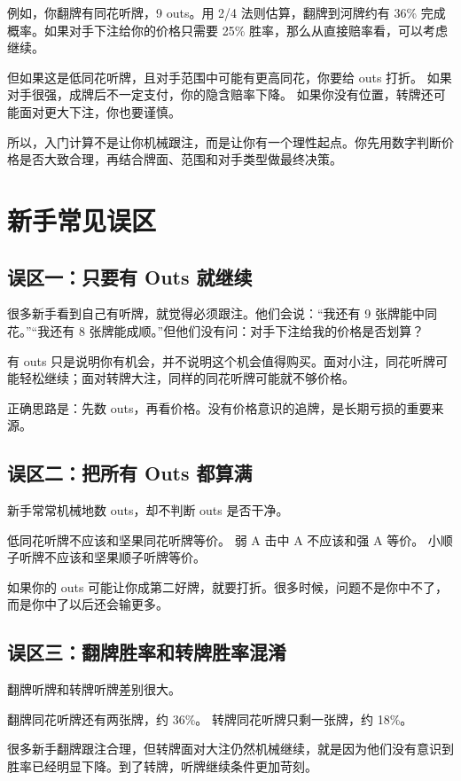 例如，你翻牌有同花听牌，9 outs。用 2/4 法则估算，翻牌到河牌约有 36\% 完成概率。如果对手下注给你的价格只需要 25\% 胜率，那么从直接赔率看，可以考虑继续。

但如果这是低同花听牌，且对手范围中可能有更高同花，你要给 outs 打折。
如果对手很强，成牌后不一定支付，你的隐含赔率下降。
如果你没有位置，转牌还可能面对更大下注，你也要谨慎。

所以，入门计算不是让你机械跟注，而是让你有一个理性起点。你先用数字判断价格是否大致合理，再结合牌面、范围和对手类型做最终决策。

\section{新手常见误区}

\subsection{误区一：只要有 Outs 就继续}

很多新手看到自己有听牌，就觉得必须跟注。他们会说：“我还有 9 张牌能中同花。”“我还有 8 张牌能成顺。”但他们没有问：对手下注给我的价格是否划算？

有 outs 只是说明你有机会，并不说明这个机会值得购买。面对小注，同花听牌可能轻松继续；面对转牌大注，同样的同花听牌可能就不够价格。

正确思路是：先数 outs，再看价格。没有价格意识的追牌，是长期亏损的重要来源。

\subsection{误区二：把所有 Outs 都算满}

新手常常机械地数 outs，却不判断 outs 是否干净。

低同花听牌不应该和坚果同花听牌等价。
弱 A 击中 A 不应该和强 A 等价。
小顺子听牌不应该和坚果顺子听牌等价。

如果你的 outs 可能让你成第二好牌，就要打折。很多时候，问题不是你中不了，而是你中了以后还会输更多。

\subsection{误区三：翻牌胜率和转牌胜率混淆}

翻牌听牌和转牌听牌差别很大。

翻牌同花听牌还有两张牌，约 36\%。
转牌同花听牌只剩一张牌，约 18\%。

很多新手翻牌跟注合理，但转牌面对大注仍然机械继续，就是因为他们没有意识到胜率已经明显下降。到了转牌，听牌继续条件更加苛刻。

